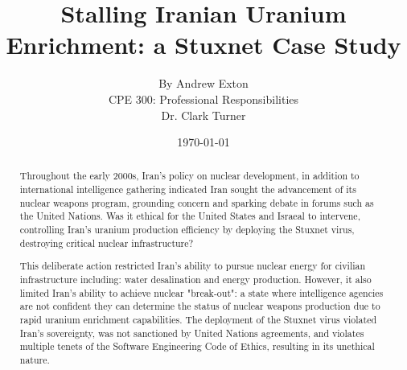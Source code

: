 \documentclass[12pt]{article}
\begin{document}
\title{\vfill Stalling Iranian Uranium Enrichment: a Stuxnet Case Study } %
\author{
By Andrew Exton \vspace{10pt} \\
CPE 300: Professional Responsibilities  \vspace{10pt} \\
Dr. Clark Turner \vspace{10pt} \\
}
\date{\today} %

\maketitle

\vfill  %
\begin{abstract}
Throughout the early 2000s, Iran's policy on nuclear development, in addition to international intelligence gathering indicated Iran sought the advancement of its nuclear weapons program, grounding concern and sparking debate in forums such as the United Nations.\cite{unitedNationsResolutions}
Was it ethical for the United States and Israeal to intervene, controlling Iran's uranium production efficiency by deploying the Stuxnet virus, destroying critical nuclear infrastructure?

This deliberate action restricted Iran's ability to pursue nuclear energy for civilian infrastructure including: water desalination and energy production. However, it also limited Iran's ability to achieve nuclear "break-out": a state where  intelligence agencies are not confident they can determine the status of nuclear weapons production due to rapid uranium enrichment capabilities. The deployment of the Stuxnet virus violated Iran's sovereignty, was not sanctioned by United Nations agreements, and violates multiple tenets of the Software Engineering Code of Ethics, resulting in its unethical nature.


\end{abstract}

\thispagestyle{empty} %
\newpage

\tableofcontents
\newpage
\end{document}
